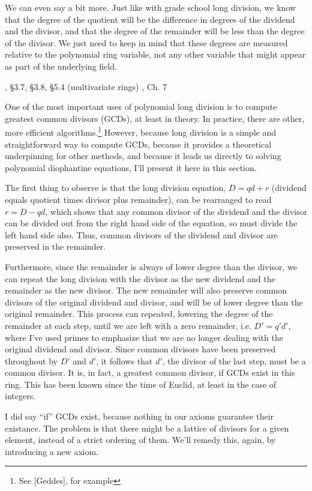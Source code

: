 We can even say a bit more.  Just like with grade school long
division, we know that the degree of the quotient will be the
difference in degrees of the dividend and the divisor, and that the
degree of the remainder will be less than the degree of the divisor.
We just need to keep in mind that these degrees are measured relative
to the polynomial ring variable, not any other variable that might
appear as part of the underlying field.

, \S3.7, \S3.8, \S5.4 (multivariate rings)\hfil\break
\hbox{}\qquad [Geddes], Ch. 7

One of the most important uses of polynomial long division is to
compute greatest common divisors (GCDs), at least in theory.  In
practice, there are other, more efficient algorithms.\footnote{See
[Geddes], for example} However, because long division is a simple and
straightforward way to compute GCDs, because it provides a theoretical
underpinning for other methods, and because it leads us directly to
solving polynomial diophantine equations, I'll present it here in this
section.

The first thing to observe is that the long division equation, $D = qd
+ r$ (dividend equals quotient times divisor plus remainder), can be
rearranged to read $r = D - qd$, which shows that any common divisor
of the dividend and the divisor can be divided out from the right hand
side of the equation, so must divide the left hand side also.  Thus,
common divisors of the dividend and divisor are preserved in the
remainder.

Furthermore, since the remainder is always of lower degree than the
divisor, we can repeat the long division with the divisor as the new
dividend and the remainder as the new divisor.  The new remainder will
also preserve common divisors of the original dividend and divisor,
and will be of lower degree than the original remainder.  This process
can repeated, lowering the degree of the remainder at each step, until
we are left with a zero remainder, i.e. $D' = q' d'$, where I've used
primes to emphasize that we are no longer dealing with the original
dividend and divisor.  Since common divisors have been preserved
throughout by $D'$ and $d'$, it follows that $d'$, the divisor of the
last step, must be a common divisor.  It is, in fact, a greatest
common divisor, if GCDs exist in this ring.  This has been known since
the time of Euclid, at least in the case of integers.

I did say ``if'' GCDs exist, because nothing in our axioms guarantee
their existance.  The problem is that there might be a lattice of
divisors for a given element, instead of a strict ordering of them.
We'll remedy this, again, by introducing a new axiom.

